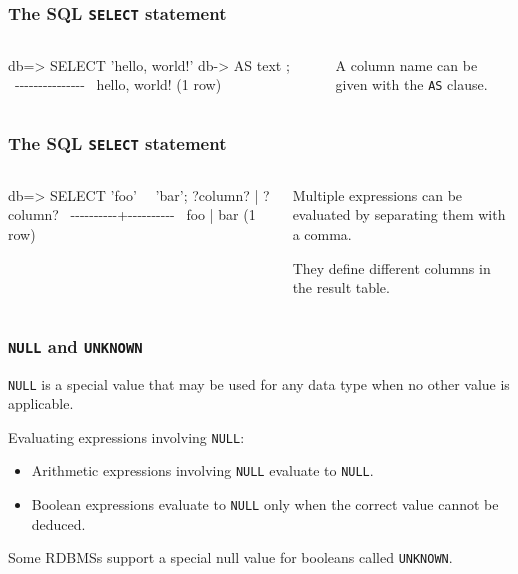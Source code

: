 \documentclass[english,serif,mathserif]{beamer}
\begin{document}
\begin{frame}[fragile]
  \frametitle{The SQL \texttt{SELECT} statement}
  \smaller

  \begin{columns}
    \begin{column}{0.5\linewidth}
\begin{sql}
db=> SELECT 'hello, world!'
db->        AS text  ;
   ~~
~-{}-{}-{}-{}-{}-{}-{}-{}-{}-{}-{}-{}-{}-{}-{}~
 hello, world!
(1 row)
\end{sql}
    \end{column}
    \begin{column}{0.5\linewidth}
    A column name can be given with the \texttt{AS} clause.
    \end{column}
  \end{columns}
\end{frame}


\begin{frame}[fragile]
  \frametitle{The SQL \texttt{SELECT} statement}
  \smaller

  \begin{columns}
    \begin{column}{0.5\linewidth}
\begin{sql}
db=> SELECT 'foo'~\HL{,}~ 'bar';
 ?column? | ?column?
~-{}-{}-{}-{}-{}-{}-{}-{}-{}-{}+{}-{}-{}-{}-{}-{}-{}-{}-{}-{}-{}~
 foo      | bar
(1 row)
\end{sql}
    \end{column}
    \begin{column}{0.5\linewidth}
      Multiple expressions can be evaluated by separating them with a comma.

      \+ They define different columns in the result table.
    \end{column}
  \end{columns}
\end{frame}


\begin{frame}
  \frametitle{\texttt{NULL} and \texttt{UNKNOWN}}
  \texttt{NULL} is a special value that may be used for any data type when no other
  value is applicable.

  \+
  Evaluating expressions involving \texttt{NULL}:
  \begin{itemize}
  \item Arithmetic expressions involving \texttt{NULL} evaluate to
    \texttt{NULL}.
  \item Boolean expressions evaluate to \texttt{NULL} only when the
    correct value cannot be deduced.
  \end{itemize}

  \+ Some RDBMSs support a special null value for booleans called
  \texttt{UNKNOWN}.
\end{frame}
\end{document}
